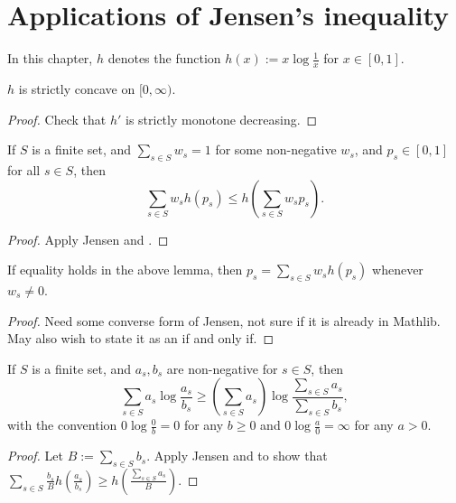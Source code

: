 \chapter{Applications of Jensen's inequality}

In this chapter, $h$ denotes the function $h(x) := x \log \frac{1}{x}$ for $x \in [0,1]$.

\begin{lemma}[Concavity]\label{concave}
  \leanok
  $h$ is strictly concave on $[0,\infty)$.
\end{lemma}

\begin{proof} \leanok Check that $h'$ is strictly monotone decreasing.
\end{proof}


\begin{lemma}[Jensen]\label{jensen}
   \leanok
  If $S$ is a finite set, and $\sum_{s \in S} w_s = 1$ for some non-negative $w_s$, and $p_s \in [0,1]$ for all $s \in S$, then
  $$ \sum_{s \in S} w_s h(p_s) \leq h(\sum_{s \in S} w_s p_s).$$
\end{lemma}

\begin{proof} \leanok Apply Jensen and .
\end{proof}

\begin{lemma}\label{converse-jensen}
  \leanok
If equality holds in the above lemma, then $p_s = \sum_{s \in S} w_s h(p_s)$ whenever $w_s \neq 0$.
\end{lemma}

\begin{proof} \leanok Need some converse form of Jensen, not sure if it is already in Mathlib.  May also wish to state it as an if and only if.
\end{proof}

\begin{lemma}
  \label{log-sum}\leanok
  If $S$ is a finite set, and $a_s,b_s$ are non-negative for $s\in S$, then
  $$\sum_{s\in S} a_s \log\frac{a_s}{b_s}\ge \left(\sum_{s\in S}a_s\right)\log\frac{\sum_{s\in S} a_s}{\sum_{s\in S} b_s},$$
  with the convention $0\log\frac{0}{b}=0$ for any $b\ge 0$ and $0\log\frac{a}{0}=\infty$ for any $a>0$.
\end{lemma}
\begin{proof}\leanok
  Let $B:=\sum_{s\in S} b_s$. Apply Jensen and  to show that $\sum_{s\in S} \frac{b_s}{B} h(\frac{a_s}{b_s})\ge h(\frac{\sum_{s\in S} a_s}{B})$.
\end{proof}

